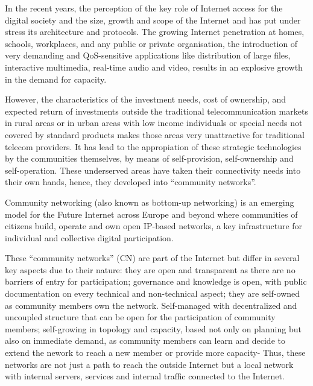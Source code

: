 \documentclass[conference]{IEEEtran}
\begin{document}
In the recent years, the perception of the key role of Internet access for the
digital society and the size, growth and scope of the Internet and has put under stress
its architecture and protocols. The growing Internet penetration at homes, schools,
workplaces, and any public or private organisation, the introduction of very demanding
and QoS-sensitive applications like distribution of large files, interactive multimedia,
real-time audio and video, results in an explosive growth in the demand for capacity.

However, the characteristics of the investment needs, cost of ownership, and expected return
of investments outside the traditional telecommunication markets in rural areas or in 
urban areas with low income individuals or special needs not covered by standard products
makes those areas very unattractive for traditional telecom providers. It has lead to the
appropiation of these strategic technologies by the communities themselves, by means of
self-provision, self-ownership and self-operation. These underserved areas have taken their
connectivity needs into their own hands, hence, they developed into ``community networks''.

Community networking (also known as bottom-up networking) is an emerging model 
for the Future Internet across Europe and beyond where communities
of citizens build, operate and own open IP-based networks, a key infrastructure
for individual and collective digital participation.

These ``community networks'' (CN) are part of the Internet but differ in several key
aspects due to their nature: they are open and transparent as there are no barriers of entry
for participation; governance and knowledge is open, with public documentation on
every technical and non-technical aspect; they are self-owned as community members
own the network. Self-managed with decentralized and uncoupled structure that can be open
for the participation of community members; self-growing in topology and capacity, based not only
on planning but also on immediate demand, as community members can learn and decide to extend the nework
to reach a new member or provide more capacity- Thus, these networks are not just
a path to reach the outside Internet but a local network with internal servers, services and
internal traffic connected to the Internet.
\end{document}

